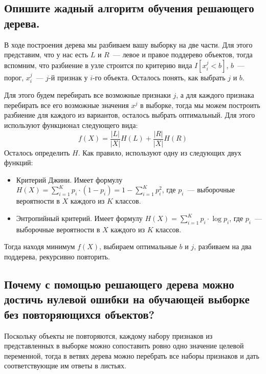 \subsection{Опишите жадный алгоритм обучения решающего дерева.}

В ходе построения дерева мы разбиваем вашу выборку на две части. Для этого представим, что у нас есть $L$ и $R$~--- левое и правое поддерево объектов, тогда вспомним, что разбиение в узле строится по критерию вида $I[x_i^j < b]$, $b$~--- порог, $x_i^j$~--- $j$-й признак у $i$-го объекта. Осталось понять, как выбрать $j$ и $b$.

Для этого будем перебирать все возможные признаки $j$, а для каждого признака перебирать все его возможные значения $x^j$ в выборке, тогда мы можем построить разбиение для каждого из вариантов, осталось выбрать оптимальный. Для этого используют функционал следующего вида:
$$
f(X) = \frac{|L|}{|X|} H(L) + \frac{|R|}{|X|} H(R)
$$
Осталось определить $H$. Как правило, используют одну из следующих двух функций:
\begin{itemize}
    \item Критерий Джини. Имеет формулу $H(X) = \sum\limits_{i = 1}^K p_i \cdot (1 - p_i) = 1 - \sum\limits_{i = 1}^K p_i^2$, где $p_i$~--- выборочные вероятности в $X$ каждого из $K$ классов.
    \item Энтропийный критерий. Имеет формулу $H(X) = \sum\limits_{i = 1}^K p_i \cdot \log p_i$, где $p_i$~--- выборочные вероятности в $X$ каждого из $K$ классов.
\end{itemize}

Тогда находя минимум $f(X)$, выбираем оптимальные $b$ и $j$, разбиваем на два поддерева, рекурсивно повторить.









\subsection{Почему с помощью решающего дерева можно достичь нулевой ошибки на обучающей
выборке без повторяющихся объектов?}

Поскольку объекты не повторяются, каждому набору признаков из представленных в выборке можно сопоставить ровно одно значение целевой переменной, тогда в ветвях дерева можно перебрать все наборы признаков и дать соответствующие им ответы в листьях.















